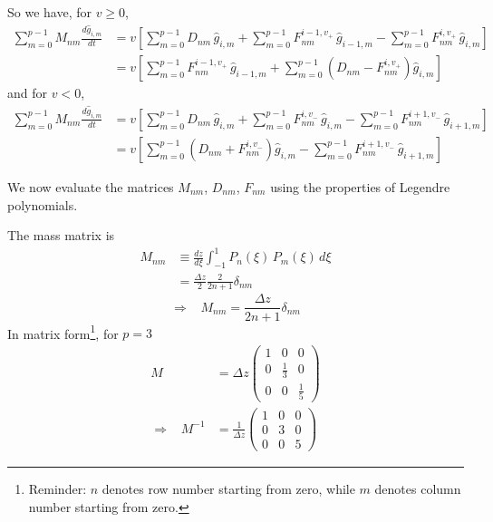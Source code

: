 \documentclass[10pt,a4paper]{article}
\begin{document}
So we have, for $v \geq 0$,
\begin{align}
\sum_{m=0}^{p-1} M_{nm} \frac{d\hat{g}_{i,m}}{dt} & = v \left[
  \sum_{m=0}^{p-1} D_{nm} \, \hat{g}_{i,m} + \sum_{m=0}^{p-1} F_{nm}^{i-1,v_+} \,
  \hat{g}_{i-1,m} - \sum_{m=0}^{p-1} F_{nm}^{i,v_+} \, \hat{g}_{i,m} \right] \nonumber \\
 & = v \left[
  \sum_{m=0}^{p-1} F_{nm}^{i-1,v_+}  \, \hat{g}_{i-1,m} + \sum_{m=0}^{p-1}
  \left(D_{nm} - F_{nm}^{i,v_+}\right) \hat{g}_{i,m} \right]
\label{eqn:sumvplus}
\end{align}
and for $v < 0$,
\begin{align}
\sum_{m=0}^{p-1} M_{nm} \frac{d\hat{g}_{i,m}}{dt} & = v \left[
  \sum_{m=0}^{p-1} D_{nm} \, \hat{g}_{i,m} + \sum_{m=0}^{p-1} F_{nm}^{i,v_-} \,
  \hat{g}_{i,m} - \sum_{m=0}^{p-1} F_{nm}^{i+1,v_-} \, \hat{g}_{i+1,m} \right] \nonumber \\
 & = v \left[
  \sum_{m=0}^{p-1} \left(D_{nm} + F_{nm}^{i,v_- }\right) \hat{g}_{i,m} -
  \sum_{m=0}^{p-1} F_{nm}^{i+1,v_-} \, \hat{g}_{i+1,m} \right]
\label{eqn:sumvminus}
\end{align}

We now evaluate the matrices $M_{nm}$, $D_{nm}$, $F_{nm}$ using the properties
of Legendre polynomials.

The mass matrix is
\begin{align*}
M_{nm} & \equiv \frac{dz}{d\xi} \int_{-1}^{1} P_n(\xi) \, P_m(\xi) \, d\xi \\
& = \frac{\Delta z}{2} \frac{2}{2n+1} \delta_{nm}
\end{align*}
\[
\Longrightarrow \;\;\; \boxed{ M_{nm}  = \frac{\Delta z}{2n+1} \delta_{nm} }
\]
In matrix form\footnote{Reminder: $n$ denotes row number starting from zero,
  while $m$ denotes column number starting from zero.}, for $p=3$
\begin{align*}
M & = \Delta z \left(
\begin{array}{ccc}
1 & 0 & 0 \\
0 & \frac{1}{3} & 0 \\
0 & 0 & \frac{1}{5}
\end{array} \right) \\
\Longrightarrow \;\;\; M^{-1} & = \frac{1}{\Delta z} \left(
\begin{array}{ccc}
1 & 0 & 0 \\
0 & 3 & 0 \\
0 & 0 & 5
\end{array} \right)
\end{align*}
\end{document}
